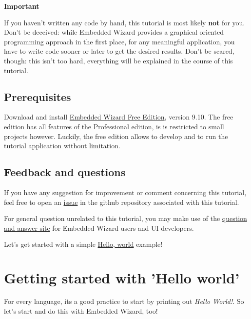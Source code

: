 \documentclass[
  a4paper,
,tablecaptionabove
]{scrbook}
\renewenvironment{quote}{\begin{customblockquote}\list{}{\rightmargin=0em\leftmargin=0em}%
\item\relax\color{blockquote-text}\ignorespaces}{\unskip\unskip\endlist\end{customblockquote}}
\begin{document}
\begin{quote}
\textbf{Important}

If you haven't written any code by hand, this tutorial is most likely
\textbf{not} for you. Don't be deceived: while Embedded Wizard provides
a graphical oriented programming approach in the first place, for any
meaningful application, you have to write code sooner or later to get
the desired results. Don't be scared, though: this isn't too hard,
everything will be explained in the course of this tutorial.
\end{quote}

\hypertarget{_prerequisites}{%
\section{Prerequisites}\label{_prerequisites}}

Download and install
\href{https://www.embedded-wizard.de/download/}{Embedded Wizard Free
Edition}, version 9.10. The free edition has all features of the
Professional edition, is is restricted to small projects however.
Luckily, the free edition allows to develop and to run the tutorial
application without limitation.

\hypertarget{_feedback_and_questions}{%
\section{Feedback and questions}\label{_feedback_and_questions}}

If you have any suggestion for improvement or comment concerning this
tutorial, feel free to open an
\href{https://github.com/deining/EmWiTutorial/issues}{issue} in the
github repository associated with this tutorial.

For general question unrelated to this tutorial, you may make use of the
\href{https://ask.embedded-wizard.de}{question and answer site} for
Embedded Wizard users and UI developers.

Let's get started with a simple
\href{https://deining.github.io/EmWiTutorial/EmWiTutorial/latest/HelloWorld.html}{Hello,
world} example!

\chapter{Getting started with 'Hello world'}


For every language, its a good practice to start by printing out
\emph{Hello World!}. So let's start and do this with Embedded Wizard,
too!
\end{document}
